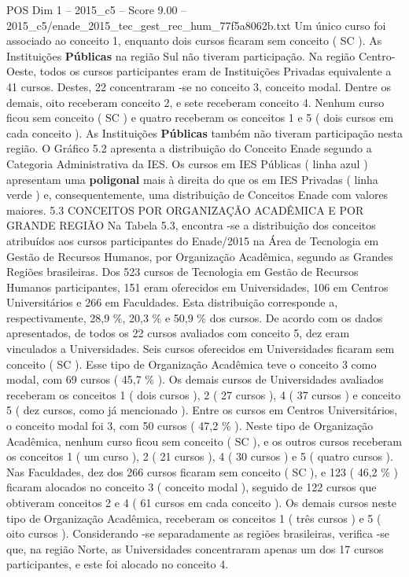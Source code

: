 \begin{textsample}{POS Dim 1 – 2015\_c5 – Score 9.00 – 2015\_c5/enade\_2015\_tec\_gest\_rec\_hum\_77f5a8062b.txt}
Um único curso foi associado ao conceito 1, enquanto dois cursos ficaram sem conceito ( SC ).
As Instituições \textbf{Públicas} na região Sul não tiveram participação.
Na região Centro-Oeste, todos os cursos participantes eram de Instituições Privadas equivalente a 41 cursos.
Destes, 22 concentraram -se no conceito 3, conceito modal.
Dentre os demais, oito receberam conceito 2, e sete receberam conceito 4.
Nenhum curso ficou sem conceito ( SC ) e quatro receberam os conceitos 1 e 5 ( dois cursos em cada conceito ).
As Instituições \textbf{Públicas} também não tiveram participação nesta região.
O Gráfico 5.2 apresenta a distribuição do Conceito Enade segundo a Categoria Administrativa da IES.
Os cursos em IES Públicas ( linha azul ) apresentam uma \textbf{poligonal} mais à direita do que os em IES Privadas ( linha verde ) e, consequentemente, uma distribuição de Conceitos Enade com valores maiores. 5.3 CONCEITOS POR ORGANIZAÇÃO ACADÊMICA E POR GRANDE REGIÃO Na Tabela 5.3, encontra -se a distribuição dos conceitos atribuídos aos cursos participantes do Enade/2015 na Área de Tecnologia em Gestão de Recursos Humanos, por Organização Acadêmica, segundo as Grandes Regiões brasileiras.
Dos 523 cursos de Tecnologia em Gestão de Recursos Humanos participantes, 151 eram oferecidos em Universidades, 106 em Centros Universitários e 266 em Faculdades.
Esta distribuição corresponde a, respectivamente, 28,9 \%, 20,3 \% e 50,9 \% dos cursos.
De acordo com os dados apresentados, de todos os 22 cursos avaliados com conceito 5, dez eram vinculados a Universidades.
Seis cursos oferecidos em Universidades ficaram sem conceito ( SC ).
Esse tipo de Organização Acadêmica teve o conceito 3 como modal, com 69 cursos ( 45,7 \% ).
Os demais cursos de Universidades avaliados receberam os conceitos 1 ( dois cursos ), 2 ( 27 cursos ), 4 ( 37 cursos ) e conceito 5 ( dez cursos, como já mencionado ).
Entre os cursos em Centros Universitários, o conceito modal foi 3, com 50 cursos ( 47,2 \% ).
Neste tipo de Organização Acadêmica, nenhum curso ficou sem conceito ( SC ), e os outros cursos receberam os conceitos 1 ( um curso ), 2 ( 21 cursos ), 4 ( 30 cursos ) e 5 ( quatro cursos ).
Nas Faculdades, dez dos 266 cursos ficaram sem conceito ( SC ), e 123 ( 46,2 \% ) ficaram alocados no conceito 3 ( conceito modal ), seguido de 122 cursos que obtiveram conceitos 2 e 4 ( 61 cursos em cada conceito ).
Os demais cursos neste tipo de Organização Acadêmica, receberam os conceitos 1 ( três cursos ) e 5 ( oito cursos ).
Considerando -se separadamente as regiões brasileiras, verifica -se que, na região Norte, as Universidades concentraram apenas um dos 17 cursos participantes, e este foi alocado no conceito 4.

\end{textsample}
